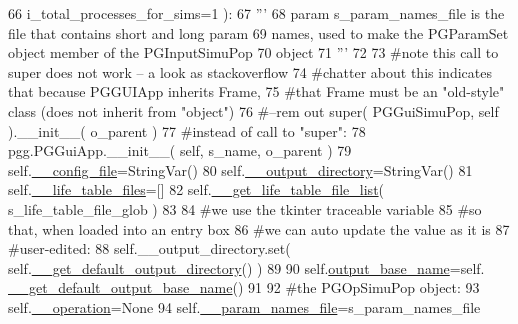 \begin{DoxyCode}
66                             i\_total\_processes\_for\_sims=1 ):
67         \textcolor{stringliteral}{'''}
68 \textcolor{stringliteral}{        param s\_param\_names\_file is the file that contains short and long param}
69 \textcolor{stringliteral}{        names, used to make the PGParamSet object  member of the PGInputSimuPop }
70 \textcolor{stringliteral}{        object}
71 \textcolor{stringliteral}{        '''}
72 
73         \textcolor{comment}{#note this call to super does not work -- a look as stackoverflow}
74         \textcolor{comment}{#chatter about this indicates that because PGGUIApp inherits Frame,}
75         \textcolor{comment}{#that Frame must be an "old-style" class (does not inherit from "object")}
76         \textcolor{comment}{#--rem out super( PGGuiSimuPop, self ).\_\_init\_\_( o\_parent )}
77         \textcolor{comment}{#instead of call to "super":}
78         pgg.PGGuiApp.\_\_init\_\_( self, s\_name, o\_parent )
79         self.\hyperlink{classnegui_1_1pgguisimupop_1_1PGGuiSimuPop_accf4b1e619efda180dcd4795425f88c8}{\_\_config\_file}=StringVar()
80         self.\hyperlink{classnegui_1_1pgguisimupop_1_1PGGuiSimuPop_a8c3dba3a47984c6174e659458da1d4c6}{\_\_output\_directory}=StringVar()
81         self.\hyperlink{classnegui_1_1pgguisimupop_1_1PGGuiSimuPop_a1871547ce6fe9a86b10a30f3d7b41cdd}{\_\_life\_table\_files}=[]
82         self.\hyperlink{classnegui_1_1pgguisimupop_1_1PGGuiSimuPop_a12344f4fdce230b8fbb699dbd74c95a2}{\_\_get\_life\_table\_file\_list}( s\_life\_table\_file\_glob )
83 
84         \textcolor{comment}{#we use the tkinter traceable variable}
85         \textcolor{comment}{#so that, when loaded into an entry box}
86         \textcolor{comment}{#we can auto update the value as it is }
87         \textcolor{comment}{#user-edited:}
88         self.\_\_output\_directory.set( self.\hyperlink{classnegui_1_1pgguisimupop_1_1PGGuiSimuPop_abba3f28989d693eadf8d8dd181502d06}{\_\_get\_default\_output\_directory}() )
89 
90         self.\hyperlink{classnegui_1_1pgguisimupop_1_1PGGuiSimuPop_aa5f9f17f0527c20e5556b574a3f97300}{output\_base\_name}=self.
      \hyperlink{classnegui_1_1pgguisimupop_1_1PGGuiSimuPop_a55130312327d03aa8e37d827a46929db}{\_\_get\_default\_output\_base\_name}() 
91 
92         \textcolor{comment}{#the PGOpSimuPop object:}
93         self.\hyperlink{classnegui_1_1pgguisimupop_1_1PGGuiSimuPop_abda3bc88b212c20ae0210bd4dda796de}{\_\_operation}=\textcolor{keywordtype}{None}
94         self.\hyperlink{classnegui_1_1pgguisimupop_1_1PGGuiSimuPop_a53d091be0140a85e8c45a76c0b89c370}{\_\_param\_names\_file}=s\_param\_names\_file

\end{DoxyCode}
